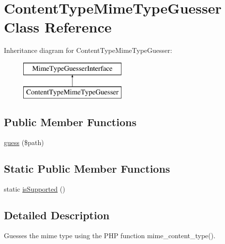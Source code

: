 \hypertarget{class_symfony_1_1_component_1_1_http_foundation_1_1_file_1_1_mime_type_1_1_content_type_mime_type_guesser}{
\section{\-Content\-Type\-Mime\-Type\-Guesser \-Class \-Reference}
\label{class_symfony_1_1_component_1_1_http_foundation_1_1_file_1_1_mime_type_1_1_content_type_mime_type_guesser}
}
\-Inheritance diagram for \-Content\-Type\-Mime\-Type\-Guesser\-:\begin{figure}[H]
\begin{center}
\leavevmode
\includegraphics[height=2.000000cm]{class_symfony_1_1_component_1_1_http_foundation_1_1_file_1_1_mime_type_1_1_content_type_mime_type_guesser}
\end{center}
\end{figure}
\subsection*{\-Public \-Member \-Functions}
\begin{DoxyCompactItemize}
\item 
\hyperlink{class_symfony_1_1_component_1_1_http_foundation_1_1_file_1_1_mime_type_1_1_content_type_mime_type_guesser_af42fcbb87eebfa7fa5e31c9c42af0c1a}{guess} (\$path)
\end{DoxyCompactItemize}
\subsection*{\-Static \-Public \-Member \-Functions}
\begin{DoxyCompactItemize}
\item 
static \hyperlink{class_symfony_1_1_component_1_1_http_foundation_1_1_file_1_1_mime_type_1_1_content_type_mime_type_guesser_adc36dedf4b7b9d79eed5296b94001311}{is\-Supported} ()
\end{DoxyCompactItemize}


\subsection{\-Detailed \-Description}
\-Guesses the mime type using the \-P\-H\-P function mime\-\_\-content\-\_\-type().

